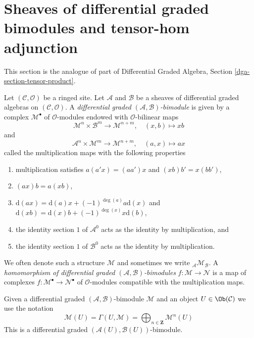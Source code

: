 \section{Sheaves of differential graded bimodules and tensor-hom adjunction}
\label{section-dg-bimodules}

\noindent
This section is the analogue of part of
Differential Graded Algebra, Section \ref{dga-section-tensor-product}.

\begin{definition}
\label{definition-dg-bimodule}
Let $(\mathcal{C}, \mathcal{O})$ be a ringed site. Let $\mathcal{A}$
and $\mathcal{B}$ be a sheaves of differential graded algebras on
$(\mathcal{C}, \mathcal{O})$. A
{\it differential graded $(\mathcal{A}, \mathcal{B})$-bimodule}
is given by a complex $\mathcal{M}^\bullet$
of $\mathcal{O}$-modules endowed with $\mathcal{O}$-bilinear maps
$$
\mathcal{M}^n \times \mathcal{B}^m \to \mathcal{M}^{n + m},\quad
(x, b) \longmapsto xb
$$
and
$$
\mathcal{A}^n \times \mathcal{M}^m \to \mathcal{M}^{n + m},\quad
(a, x) \longmapsto ax
$$
called the multiplication maps with the following properties
\begin{enumerate}
\item multiplication satisfies $a(a'x) = (aa')x$ and
$(xb)b' = x(bb')$,
\item $(ax)b = a(xb)$,
\item $\text{d}(ax) = \text{d}(a) x + (-1)^{\deg(a)}a \text{d}(x)$ and
$\text{d}(xb) = \text{d}(x) b + (-1)^{\deg(x)}x \text{d}(b)$,
\item the identity section $1$ of $\mathcal{A}^0$ acts as the
identity by multiplication, and
\item the identity section $1$ of
$\mathcal{B}^0$ acts as the identity by multiplication.
\end{enumerate}
We often denote such a structure $\mathcal{M}$ and sometimes
we write ${}_\mathcal{A}\mathcal{M}_\mathcal{B}$.
A {\it homomorphism of differential graded
$(\mathcal{A}, \mathcal{B})$-bimodules}
$f : \mathcal{M} \to \mathcal{N}$ is a map of complexes
$f : \mathcal{M}^\bullet \to \mathcal{N}^\bullet$
of $\mathcal{O}$-modules compatible with the multiplication maps.
\end{definition}

\noindent
Given a differential graded $(\mathcal{A}, \mathcal{B})$-bimodule $\mathcal{M}$
and an object $U \in \Ob(\mathcal{C})$ we use the notation
$$
\mathcal{M}(U) =
\Gamma(U, \mathcal{M}) =
\bigoplus\nolimits_{n \in \mathbf{Z}} \mathcal{M}^n(U)
$$
This is a differential graded $(\mathcal{A}(U), \mathcal{B}(U))$-bimodule.

